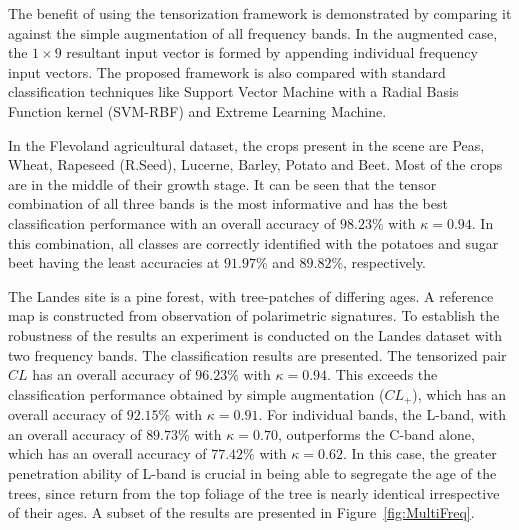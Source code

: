 \documentclass[12pt, a4paper]{article}
\begin{document}
The benefit of using the tensorization framework is demonstrated by comparing it  against the simple augmentation of all frequency bands. In the augmented case, the $1\times9$ resultant input vector is formed by appending individual frequency input vectors. The proposed framework is also compared with standard classification techniques like Support Vector Machine with a Radial Basis Function kernel (SVM-RBF) and Extreme Learning Machine.

In the Flevoland agricultural dataset, the crops present in the scene are Peas, Wheat, Rapeseed (R.Seed), Lucerne, Barley, Potato and Beet. Most of the crops are in the middle of their growth stage.  
It can be seen that the tensor combination of all three bands is the most informative and has the best classification performance with an overall accuracy of $98.23\%$ with $\kappa = 0.94$. In this combination, all classes are correctly identified with the potatoes and sugar beet having the least accuracies at $91.97\%$ and $89.82\%$, respectively.

The Landes site is a pine forest, with tree-patches of differing ages. A reference map is constructed from observation of polarimetric signatures. To establish the robustness of the results an experiment is conducted on the Landes dataset with two frequency bands. The classification results are presented. The tensorized pair $CL$ has an overall accuracy of $96.23\%$ with $\kappa=0.94$. This exceeds the classification performance obtained by simple augmentation ($CL_+$), which has an overall accuracy of $92.15\%$ with $\kappa=0.91$. For individual bands, the L-band, with an overall accuracy of  $89.73\%$ with $\kappa=0.70$, outperforms the C-band alone, which has an overall accuracy of  $77.42\%$ with $\kappa=0.62$. In this case, the greater penetration ability of L-band is crucial in being able to segregate the age of the trees, since return from the top foliage of the tree is nearly identical irrespective of their ages. A subset of the results are presented in Figure~\ref{fig:MultiFreq}.
\end{document}
